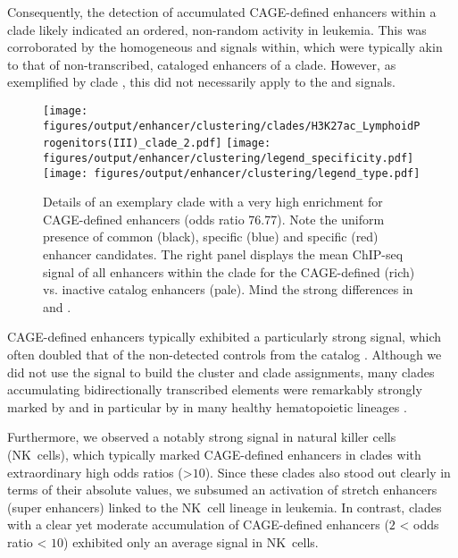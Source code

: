 Consequently, the detection of accumulated CAGE-defined enhancers within a clade likely indicated an ordered, non-random activity in leukemia. This was corroborated by the homogeneous \hisfourone and \histwentysevenac signals within, which were typically akin to that of non-transcribed, cataloged enhancers of a clade. However, as exemplified by clade , this did not necessarily apply to the \hisfourtwo and \hisfourthree signals. 

\begin{figure}[!htb]
	\texttt{[image: figures/output/enhancer/clustering/clades/H3K27ac\_LymphoidProgenitors(III)\_clade\_2.pdf]}
	\texttt{[image: figures/output/enhancer/clustering/legend\_specificity.pdf]}
	\texttt{[image: figures/output/enhancer/clustering/legend\_type.pdf]}
	\caption{Details of an exemplary clade with a very high enrichment for CAGE-defined enhancers (odds ratio \num{76.77}). Note the uniform presence of common (black),  \dnmtwtregular specific (blue) and  \dnmtchipregular specific (red) enhancer candidates. The right panel displays the mean ChIP-seq signal of all enhancers within the clade for the CAGE-defined (rich) vs. inactive catalog enhancers (pale). Mind the strong differences in \hisfourtwo and \hisfourthree.}
	\label{fig:enhancers:amit_nkclade}
\end{figure}

CAGE-defined enhancers typically exhibited a particularly strong \hisfourthree signal, which often doubled that of the non-detected controls from the catalog . Although we did not use the \hisfourthree signal to build the cluster and clade assignments, many clades accumulating bidirectionally transcribed elements were remarkably strongly marked by \hisfourtwo and in particular by \hisfourthree in many healthy hematopoietic lineages	. 

Furthermore, we observed a notably strong \histwentysevenac signal in natural killer cells (NK~cells), which typically marked CAGE-defined enhancers in clades with extraordinary high odds ratios (>$10$). Since these clades also stood out clearly in terms of their absolute values, we subsumed an activation of stretch enhancers (super enhancers) linked to the NK~cell lineage in \mllafnine leukemia. In contrast, clades with a clear yet moderate accumulation of CAGE-defined enhancers ($2$ < odds ratio < $10$) exhibited only an average \histwentysevenac signal in NK~cells\supplefig.

